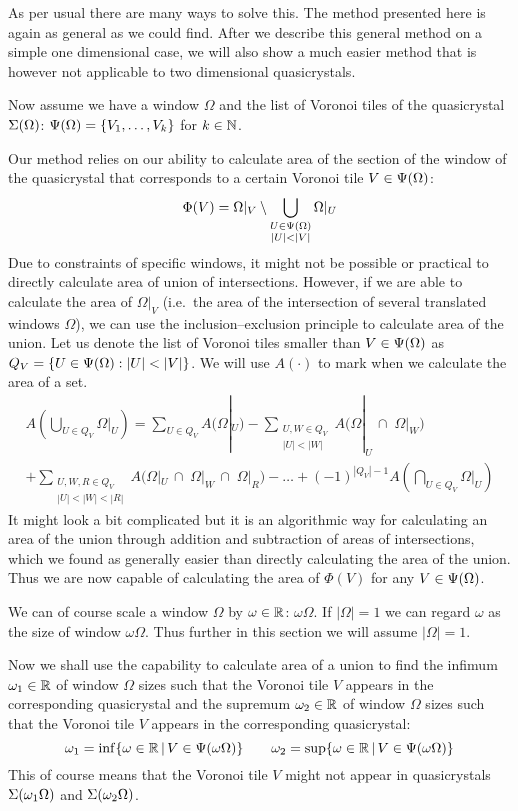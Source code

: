 \documentclass[text.tex]{subfiles}
\begin{document}
As per usual there are many ways to solve this. The method presented here is again as general as we could find. After we describe this general method on a simple one dimensional case, we will also show a much easier method that is however not applicable to two dimensional quasicrystals. 

Now assume we have a window $\Omega$ and the list of Voronoi tiles of the quasicrystal $\Sigma(\Omega)$: $\Psi(\Omega) = \{V_1,\dots,V_k\}$ for $k\in\mathbb{N}$. 

Our method relies on our ability to calculate area of the section of the window of the quasicrystal that corresponds to a certain Voronoi tile $V\in\Psi(\Omega)$: 
$$\Phi(V) = \Omega|_{V}\setminus\bigcup_{\substack{U\in\quasilist{\Omega}\\|U|<|V|}}\Omega|_{U}$$
Due to constraints of specific windows, it might not be possible or practical to directly calculate area of union of intersections. However, if we are able to calculate the area of $\Omega|_{V}$ (i.e.\ the area of the intersection of several translated windows $\Omega$), we can use the inclusion--exclusion principle to calculate area of the union. Let us denote the list of Voronoi tiles smaller than $V\in\Psi(\Omega)$ as $Q_V = \{U\in\quasilist{\Omega}:|U|<|V|\}$. We will use $A(\cdot)$ to mark when we calculate the area of a set. 
\begin{multline*}
A\left(\bigcup_{U\in Q_V}\Omega|_{U}\right) = \sum_{U\in Q_V}A\big(\Omega|_U\big) - \sum_{\substack{U,W\in Q_V\\ |U|<|W|}}A\big(\Omega|_U\,\cap\;\Omega|_W\big)\\
+\sum_{\substack{U,W,R\in Q_V\\ |U|<|W|<|R|}}A\big(\Omega|_U\,\cap\;\Omega|_W\,\cap\;\Omega|_R\big) - \dots + (-1)^{|Q_V|-1}A\left(\bigcap_{U\in Q_V} \Omega|_U\right)
\end{multline*}
It might look a bit complicated but it is an algorithmic way for calculating an area of the union through addition and subtraction of areas of intersections, which we found as generally easier than directly calculating the area of the union. Thus we are now capable of calculating the area of $\Phi(V)$ for any $V\in\Psi(\Omega)$. 

We can of course scale a window $\Omega$ by $\omega\in\mathbb{R}$: $\omega\Omega$. If $|\Omega|=1$ we can regard $\omega$ as the size of window $\omega\Omega$. Thus further in this section we will assume $|\Omega|=1$. 

Now we shall use the capability to calculate area of a union to find the infimum $\omega_1\in\mathbb{R}$ of window $\Omega$ sizes such that the Voronoi tile $V$ appears in the corresponding quasicrystal and the supremum $\omega_2\in\mathbb{R}$ of window $\Omega$ sizes such that the Voronoi tile $V$ appears in the corresponding quasicrystal:
$$\omega_1 = \inf\{\omega\in\mathbb{R} \,|\, V\in\Psi(\omega\Omega)\} \qquad \omega_2 = \sup\{\omega\in\mathbb{R} \,|\, V\in\Psi(\omega\Omega)\}$$
This of course means that the Voronoi tile $V$ might not appear in quasicrystals $\Sigma(\omega_1\Omega)$ and $\Sigma(\omega_2\Omega)$. 
\end{document}
